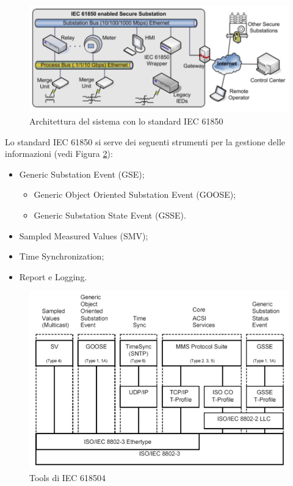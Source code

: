 \begin{figure}[h]
	\centering
	\includegraphics[scale=0.350]{imgs/arch_iec61850.png}
	\caption{Architettura del sistema con lo standard IEC 61850} \label{fig:arch_iec61850}
\end{figure}

Lo standard IEC 61850 si serve dei seguenti strumenti per la gestione delle informazioni (vedi Figura \ref{fig:tools_iec61850}):
\begin{itemize}
	\item Generic Substation Event (GSE);
	\begin{itemize}
		\item Generic Object Oriented Substation Event (GOOSE);
		\item Generic Substation State Event (GSSE).
	\end{itemize}
	\item Sampled Measured Values (SMV);
	\item Time Synchronization;
	\item Report e Logging.
\end{itemize}
\begin{figure}[h]
	\centering
	\includegraphics[scale=0.350]{imgs/tools_iec61850.png}
	\caption{Tools di IEC 618504} \label{fig:tools_iec61850}
\end{figure}
